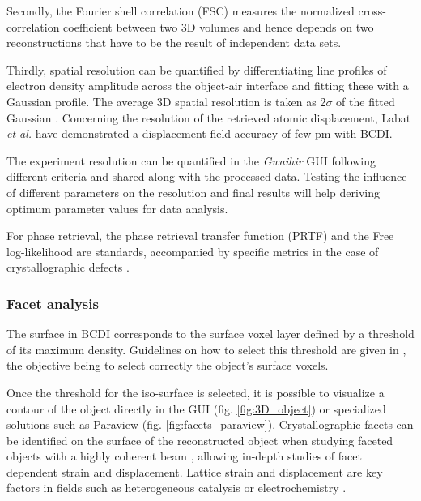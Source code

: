 Secondly, the Fourier shell correlation (FSC) \parencite{van_heel_fourier_2005} measures the normalized cross-correlation coefficient between two 3D volumes and hence depends on two reconstructions that have to be the result of independent data sets.

Thirdly, spatial resolution can be quantified by differentiating line profiles of electron density amplitude across the object-air interface and fitting these with a Gaussian profile.
The average 3D spatial resolution is taken as 2$\sigma$ of the fitted Gaussian \parencite{hofmann_nanoscale_2020}. Concerning the resolution of the retrieved atomic displacement, Labat \textit{et al.} \cite{labat_inversion_2015} have demonstrated a displacement field accuracy of few pm with BCDI.

The experiment resolution can be quantified in the \textit{Gwaihir} GUI following different criteria and shared along with the processed data. Testing the influence of different parameters on the resolution and final results will help deriving optimum parameter values for data analysis.

For phase retrieval, the phase retrieval transfer function (PRTF) \parencite{chapman_high-resolution_2006,cherukara_anisotropic_2018} and the Free log-likelihood \parencite{pynx2020FLLK} are standards, accompanied by specific metrics in the case of crystallographic defects \parencite{Ulvestad2017}.

\subsubsection{Facet analysis}

The surface in BCDI corresponds to the surface voxel layer defined by a threshold of its maximum density.
Guidelines on how to select this threshold are given in \cite{Carnis2019_scientific_reports}, the objective being to select correctly the object's surface voxels.

Once the threshold for the iso-surface is selected, it is possible to visualize a contour of the object directly in the GUI (fig. \ref{fig:3D_object}) or specialized solutions such as Paraview \parencite{ahrens2005paraview} (fig. \ref{fig:facets_paraview}). Crystallographic facets can be identified on the surface of the reconstructed object when studying faceted objects with a highly coherent beam \parencite{richard_crystallographic_2018}, allowing in-depth studies of facet dependent strain and displacement. Lattice strain and displacement are key factors in fields such as heterogeneous catalysis \parencite{ulvestad_situ_2016,kim_active_2018,fernandez_situ_2019,Passos2020,Carnis2021} or electrochemistry \parencite{vicente_bragg_2021}.

